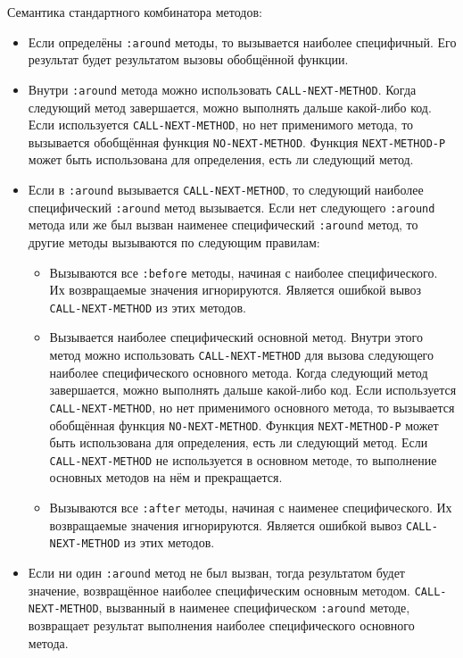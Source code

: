 Семантика стандартного комбинатора методов:
\begin{itemize}
  \item Если определёны \lstinline{:around} методы, то вызывается наиболее специфичный. Его результат будет результатом вызовы обобщённой функции.
  \item Внутри \lstinline{:around} метода можно использовать \lstinline{CALL-NEXT-METHOD}. Когда следующий метод завершается, можно выполнять дальше какой-либо код. Если используется \lstinline{CALL-NEXT-METHOD}, но нет применимого метода, то вызывается обобщённая функция \lstinline{NO-NEXT-METHOD}. Функция \lstinline{NEXT-METHOD-P} может быть использована для определения, есть ли следующий метод.
  \item Если в \lstinline{:around} вызывается \lstinline{CALL-NEXT-METHOD}, то следующий наиболее специфический \lstinline{:around} метод вызывается. Если нет следующего \lstinline{:around} метода или же был вызван наименее специфический \lstinline{:around} метод, то другие методы вызываются по следующим правилам:
    \begin{itemize}
      \item Вызываются все \lstinline{:before} методы, начиная с наиболее специфического. Их возвращаемые значения игнорируются. Является ошибкой вывоз \lstinline{CALL-NEXT-METHOD} из этих методов.
      \item Вызывается наиболее специфический основной метод. Внутри этого метод можно использовать \lstinline{CALL-NEXT-METHOD} для вызова следующего наиболее специфического основного метода. Когда следующий метод завершается, можно выполнять дальше какой-либо код. Если используется \lstinline{CALL-NEXT-METHOD}, но нет применимого основного метода, то вызывается обобщённая функция \lstinline{NO-NEXT-METHOD}. Функция \lstinline{NEXT-METHOD-P} может быть использована для определения, есть ли следующий метод. Если \lstinline{CALL-NEXT-METHOD} не используется в основном методе, то выполнение основных методов на нём и прекращается.
      \item Вызываются все \lstinline{:after} методы, начиная с наименее специфического. Их возвращаемые значения игнорируются. Является ошибкой вывоз \lstinline{CALL-NEXT-METHOD} из этих методов.
    \end{itemize}
  \item Если ни один \lstinline{:around} метод не был вызван, тогда результатом будет значение, возвращённое наиболее специфическим основным методом. \lstinline{CALL-NEXT-METHOD}, вызванный в наименее специфическом \lstinline{:around} методе, возвращает результат выполнения наиболее специфического основного метода.
\end{itemize}

